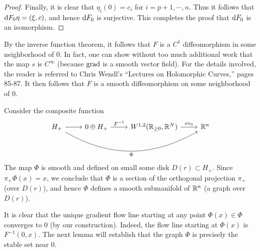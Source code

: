 \begin{proof}
  Finally, it is clear that $\eta_{i}(0)=c_{i}$ for $i=p+1,\cdots,n$. Thus it follows that $\mathrm{d} F_{0}\eta=(\xi,c)$, and hence $\mathrm{d} F_{0}$ is surjective. This completes the proof that $\mathrm{d} F_{0}$ is an isomorphism.  
\end{proof}

By the inverse function theorem, it follows that $F$ is a $C^{1}$ diffeomorphism in some neighborhood of $0$. In fact, one can show without too much additional work that the map $s$ is $C^{\infty}$ (because $\mathrm{grad}$ is a smooth vector field). For the details involved, the reader is referred to Chris Wendl's ``Lectures on Holomorphic Curves,'' pages 85-87. It then follows that $F$ is a smooth diffeomorphism on some neighborhood of $0$.

Consider the composite function
\begin{equation*}
  \begin{tikzcd}
    H_{+}\arrow[r]\arrow[rrr,out=-30,in=210,"\Phi",swap]&0\oplus H_{+}\arrow[r,"F^{-1}"]&W^{1,2}(\R_{\ge 0},\R^{N})\arrow[r,"\text{ev}_{0}"]&\R^{n}
  \end{tikzcd}
\end{equation*}
The map $\Phi$ is smooth and defined on small some disk $D(r)\subset H_{+}$. Since $\pi_{+}\Phi(x)=x$, we conclude that $\Phi$ is a section of the orthogonal projection $\pi_{+}$ (over $D(r)$), and hence $\Phi$ defines a smooth submanifold of $\mathbb{R}^{n}$ (a graph over $D(r)$).

It is clear that the unique gradient flow line starting at any point $\Phi(x)\in \Phi$ converges to $0$ (by our construction). Indeed, the flow line starting at $\Phi(x)$ is $F^{-1}(0,x)$. The next lemma will establish that the graph $\Phi$ is precisely the stable set near $0$.


